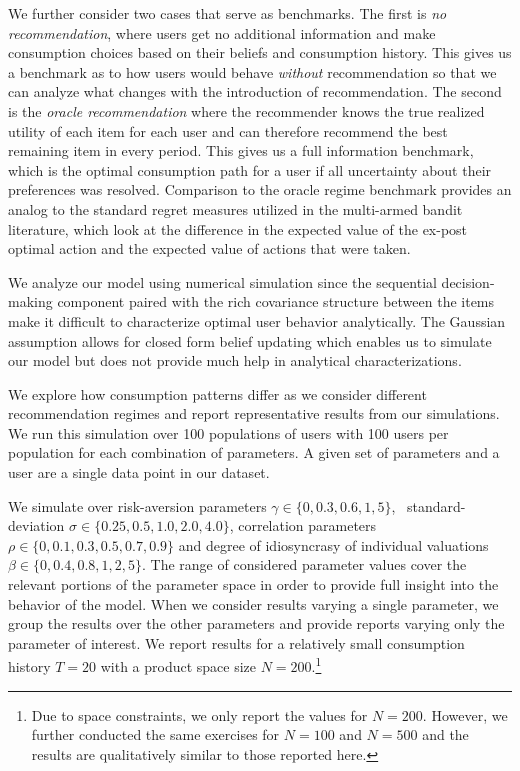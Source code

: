 \documentclass[manuscript]{acmart}
\newcommand{\xhdr}[1]{\vspace{1mm} \noindent{\bf #1}}
\begin{document}
We further consider two cases that serve  as benchmarks. The first is \textit{no recommendation}, where users get no additional information and make consumption choices based on their beliefs and consumption history. This gives us a benchmark as to how users would behave \textit{without} recommendation so that we can analyze what changes with the introduction of recommendation. The second is the \textit{oracle recommendation} where the recommender knows the true realized utility of each item for each user and can therefore recommend the best remaining item in every period. This gives us a full information benchmark, which is the optimal consumption path for a user if all uncertainty about their preferences was resolved. Comparison to the oracle regime benchmark provides an analog to the standard regret measures utilized in the multi-armed bandit literature, which look at the difference in the expected value of the ex-post optimal action and the expected value of actions that were taken.
\par

\xhdr{Simulation Details.}
We analyze our model using numerical simulation since the sequential decision-making component paired with the rich covariance structure between the items make it difficult to characterize optimal user behavior analytically. The Gaussian assumption allows for closed form belief updating which enables us to simulate our model but does not provide much help in analytical characterizations. 
\par

We explore how consumption patterns differ as we consider different recommendation regimes and report representative results from our simulations. We run this simulation over 100 populations of users with 100 users per population for each combination of parameters. 
A given set of parameters and a user are a single data point in our dataset.
\par

We simulate over risk-aversion parameters $\gamma \in \{ 0, 0.3, 0.6, 1, 5 \}$, \ standard-deviation $\sigma \in \{ 0.25, 0.5, 1.0, 2.0, 4.0 \}$, correlation parameters $\rho\in \{ 0, 0.1, 0.3, 0.5, 0.7, 0.9 \} $ and degree of idiosyncrasy of individual valuations $\beta \in \{ 0, 0.4, 0.8, 1, 2, 5\}$. The range of considered parameter values cover the relevant portions of the parameter space in order to provide full insight into the behavior of the model. When we consider results varying a single parameter, we group the results over the other parameters and provide reports varying only the parameter of interest. We report results for a relatively small consumption history $T=20$ with a product space size $N=200$.\footnote{Due to space constraints, we only report the values for $N = 200$. However, we further conducted the same exercises for $N = 100$ and $N = 500$ and the results are qualitatively similar to those reported here.}
\end{document}
